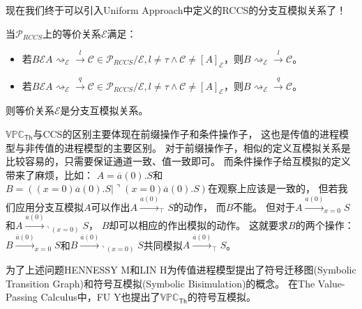    现在我们终于可以引入Uniform Approach中定义的RCCS的分支互模拟关系了！

   \begin{definition}
      当$\mathcal{P}_{RCCS}$上的等价关系$\mathcal{E}$满足：
      \begin{itemize}
         \item {
            若$B\mathcal{E}A\rightsquigarrow_{\mathcal{E}}\stackrel{l}{\rightarrow}\mathcal{C}\in \mathcal{P}_{RCCS}/\mathcal{E}, l\neq \tau \wedge \mathcal{C}\neq [A]_{\mathcal{E}}$，则$B\rightsquigarrow_{\mathcal{E}}\stackrel{l}{\rightarrow}\mathcal{C}$。
         }
         \item {
            若$B\mathcal{E}A\rightsquigarrow_{\mathcal{E}}\stackrel{q}{\rightarrow}\mathcal{C}\in \mathcal{P}_{RCCS}/\mathcal{E}, l\neq \tau \wedge \mathcal{C}\neq [A]_{\mathcal{E}}$，则$B\rightsquigarrow_{\mathcal{E}}\stackrel{q}{\rightarrow}\mathcal{C}$。
         }
      \end{itemize}
      则等价关系$\mathcal{E}$是分支互模拟关系。
   \end{definition}

   $\mathbb{VPC}_{\mathsf{Th}}$与CCS的区别主要体现在前缀操作子和条件操作子，
   这也是传值的进程模型与非传值的进程模型的主要区别。
   对于前缀操作子，相似的定义互模拟关系是比较容易的，只需要保证通道一致、值一致即可。
   而条件操作子给互模拟的定义带来了麻烦，比如：
   $A=\overline{a}(0).S$和$B=((x=0) \overline{a}(0).S|\urcorner (x=0) \overline{a}(0).S)$在观察上应该是一致的，
   但若我们应用分支互模拟$A$可以作出$A\stackrel{a(0)}{\rightarrow}_{\top}S$的动作，
   而$B$不能。
   但对于$A\stackrel{a(0)}{\rightarrow}_{x=0}S$和$A\stackrel{a(0)}{\rightarrow}_{\urcorner (x=0)}S$，
   $B$却可以相应的作出模拟的动作。
   这就要求$B$的两个操作：$B\stackrel{\overline{a}(0)}{\longrightarrow}_{x=0} S$和$B\stackrel{\overline{a}(0)}{\longrightarrow}_{\urcorner (x=0)} S$共同模拟$A\stackrel{\overline{a}(0)}{\longrightarrow}_{\top} S$。

   为了上述问题HENNESSY M和LIN H为传值进程模型提出了符号迁移图(Symbolic Transition Graph)和符号互模拟(Symbolic Bisimulation)的概念\cite{Symbolic_bisimulation}。
   在The Value-Passing Calculus中，FU Y也提出了$\mathbb{VPC}_\mathsf{Th}$的符号互模拟\cite{Fu_VPC}。
   

